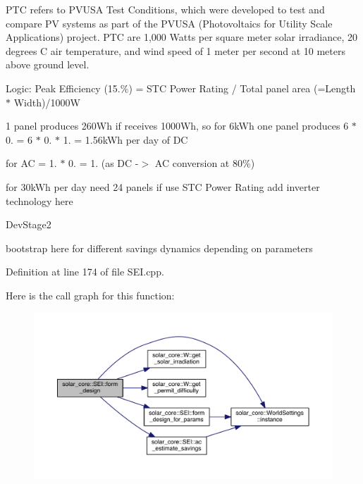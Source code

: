 P\+T\+C refers to P\+V\+U\+S\+A Test Conditions, which were developed to test and compare P\+V systems as part of the P\+V\+U\+S\+A (Photovoltaics for Utility Scale Applications) project. P\+T\+C are 1,000 Watts per square meter solar irradiance, 20 degrees C air temperature, and wind speed of 1 meter per second at 10 meters above ground level.

Logic\+: Peak Efficiency (15.\%) = S\+T\+C Power Rating / Total panel area (=Length $\ast$ Width)/1000\+W

1 panel produces 260\+Wh if receives 1000\+Wh, so for 6k\+Wh one panel produces 6 $\ast$ 0. = 6 $\ast$ 0. $\ast$ 1. = 1.\+56k\+Wh per day of D\+C

for A\+C = 1. $\ast$ 0. = 1. (as D\+C -\/$>$ A\+C conversion at 80\%)

for 30k\+Wh per day need 24 panels if use S\+T\+C Power Rating add inverter technology here

\begin{DoxyRefDesc}{Dev\+Stage2}
\item[\hyperlink{_dev_stage2__DevStage2000009}{Dev\+Stage2}]bootstrap here for different savings dynamics depending on parameters \end{DoxyRefDesc}


Definition at line 174 of file S\+E\+I.\+cpp.



Here is the call graph for this function\+:
\nopagebreak
\begin{figure}[H]
\begin{center}
\leavevmode
\includegraphics[width=350pt]{classsolar__core_1_1_s_e_i_a807561ad055ddc0df91b80ba406ee6df_cgraph}
\end{center}
\end{figure}




